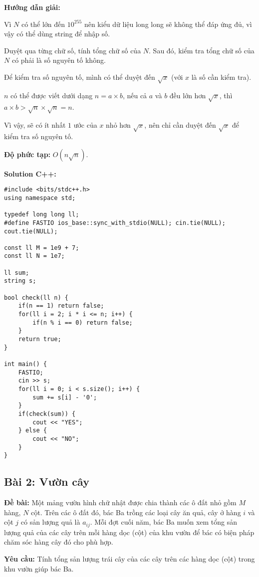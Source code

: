 \documentclass[12pt]{scrartcl}  %
\begin{document}
\textbf{Hướng dẫn giải:}

Vì $N$ có thể lớn đến $10^{255}$ nên kiểu dữ liệu long long sẽ không thể đáp ứng đủ,
vì vậy có thể dùng string để nhập số.

Duyệt qua từng chữ số, tính tổng chữ số của $N$. Sau đó, kiểm tra tổng chữ số của $N$ có phải là số nguyên tố không.

Để kiểm tra số nguyên tố, mình có thể duyệt đến $\sqrt{x}$ (với $x$ là số cần kiểm tra).

$n$ có thể được viết dưới dạng $n = a \times b$, nếu cả $a$ và $b$ đều lớn hơn $\sqrt{x}$,
thì $a \times b > \sqrt{n} \times \sqrt{n} = n$.

Vì vậy, sẽ có ít nhất $1$ ước của $x$ nhỏ hơn $\sqrt{x}$, nên chỉ cần duyệt đến $\sqrt{x}$
để kiểm tra số nguyên tố.

\textbf{Độ phức tạp:} $O(n\sqrt{n})$.

\textbf{Solution C++:}
\begin{lstlisting}
#include <bits/stdc++.h>
using namespace std;

typedef long long ll;
#define FASTIO ios_base::sync_with_stdio(NULL); cin.tie(NULL); cout.tie(NULL);

const ll M = 1e9 + 7;
const ll N = 1e7;

ll sum;
string s;

bool check(ll n) {
    if(n == 1) return false;
    for(ll i = 2; i * i <= n; i++) {
        if(n % i == 0) return false;
    }
    return true;
}

int main() {
    FASTIO;
    cin >> s;
    for(ll i = 0; i < s.size(); i++) {
        sum += s[i] - '0';
    }
    if(check(sum)) {
        cout << "YES";
    } else {
        cout << "NO";
    }
}

\end{lstlisting}

\subsection{Bài 2: Vườn cây}
\textbf{Đề bài:}
Một mảng vườn hình chữ nhật được chia thành các ô đất nhỏ gồm $M$ hàng, $N$ cột. Trên các ô đất 
đó, bác Ba trồng các loại cây ăn quả, cây ở hàng $i$ và cột $j$ có sản lượng quả là $a_{ij}$. Mỗi đợt cuối năm, 
bác Ba muốn xem tổng sản lượng quả của các cây trên mỗi hàng dọc (cột) của khu vườn để bác có biện pháp chăm sóc hàng cây đó cho phù hợp.

\textbf{Yêu cầu:}
Tính tổng sản lượng trái cây của các cây trên các hàng dọc (cột) trong khu vườn giúp bác Ba. 
\end{document}
